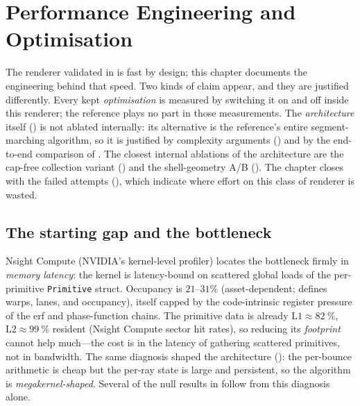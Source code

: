 \chapter{Performance Engineering and Optimisation}
\label{ch:optimization}

The renderer validated in  is fast by design; this chapter documents the
engineering behind that speed. Two kinds of claim appear, and they are justified differently.
Every kept \emph{optimisation} is measured by switching it on and off inside this renderer;
the reference plays no part in those measurements. The \emph{architecture} itself
() is not ablated internally: its alternative is the reference's entire
segment-marching algorithm, so it is justified by complexity arguments
() and by the end-to-end comparison of . The closest
internal ablations of the architecture are the cap-free collection variant
() and the shell-geometry A/B (). The chapter closes with the failed attempts (), which indicate where
effort on this class of renderer is wasted.

\section{The starting gap and the bottleneck}
\label{sec:bottleneck}

Nsight Compute (NVIDIA's kernel-level profiler) locates the bottleneck firmly in
\emph{memory latency}: the kernel is latency-bound on scattered global loads of the per-primitive
\texttt{Primitive} struct. Occupancy is $21$--$31\%$ (asset-dependent;  defines warps,
lanes, and occupancy), itself capped by the code-intrinsic register
pressure of the erf and phase-function chains. The primitive data is already
$\mathrm{L1}\approx\SI{82}{\percent}$, $\mathrm{L2}\approx\SI{99}{\percent}$
resident (Nsight Compute sector hit rates), so reducing its \emph{footprint} cannot help much---the cost is in the latency of
gathering scattered primitives, not in bandwidth. The same diagnosis
shaped the architecture (): the per-bounce arithmetic is cheap but the per-ray state
is large and persistent, so the algorithm is \emph{megakernel-shaped}. Several of the null results
in  follow from this diagnosis alone.

